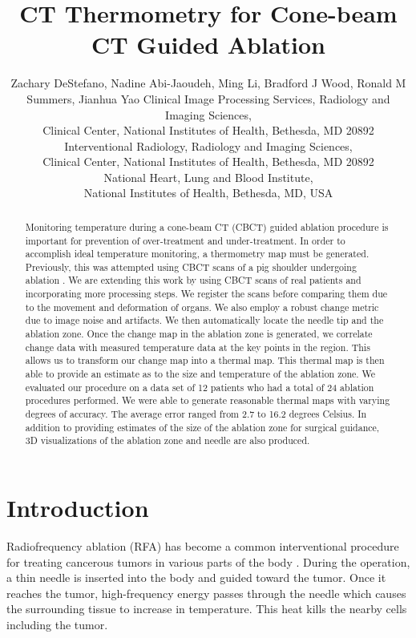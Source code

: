 \documentclass[]{spie}  %
\title{CT Thermometry for Cone-beam CT Guided Ablation}
\author{Zachary DeStefano\supit{a}, Nadine Abi-Jaoudeh\supit{b}, Ming Li\supit{c}, Bradford J Wood\supit{b}, Ronald M Summers\supit{a}, Jianhua Yao\supit{a}
\skiplinehalf
\supit{a}Clinical Image Processing Services, Radiology and Imaging Sciences, \\Clinical Center, National Institutes of Health, Bethesda, MD 20892\\
\supit{b}Interventional Radiology, Radiology and Imaging Sciences, \\Clinical Center, National Institutes of Health, Bethesda, MD 20892\\
\supit{c}National Heart, Lung and Blood Institute, \\National Institutes of Health, Bethesda, MD, USA
}
\begin{document}
 
  \maketitle 

\begin{abstract}
Monitoring temperature during a cone-beam CT (CBCT) guided ablation procedure is important for prevention of over-treatment and under-treatment. In order to accomplish ideal temperature monitoring, a thermometry map must be generated.  Previously, this was attempted using CBCT scans of a pig shoulder undergoing ablation \cite{Li13}. We are extending this work by using CBCT scans of real patients and incorporating more processing steps. We register the scans before comparing them due to the movement and deformation of organs. We also employ a robust change metric due to image noise and artifacts. We then automatically locate the needle tip and the ablation zone. Once the change map in the ablation zone is generated, we correlate change data with measured temperature data at the key points in the region. This allows us to transform our change map into a thermal map. This thermal map is then able to provide an estimate as to the size and temperature of the ablation zone. We evaluated our procedure on a data set of 12 patients who had a total of 24 ablation procedures performed. We were able to generate reasonable thermal maps with varying degrees of accuracy. The average error ranged from 2.7 to 16.2 degrees Celsius. In addition to providing estimates of the size of the ablation zone for surgical guidance, 3D visualizations of the ablation zone and needle are also produced.  
\end{abstract}



\section{Introduction}
\label{sec:intro}  %

Radiofrequency ablation (RFA) has become a common interventional procedure for treating cancerous tumors in various parts of the body \cite{Mayo15}. During the operation, a thin needle is inserted into the body and guided toward the tumor. Once it reaches the tumor, high-frequency energy passes through the needle which causes the surrounding tissue to increase in temperature. This heat kills the nearby cells including the tumor. 
\end{document}

